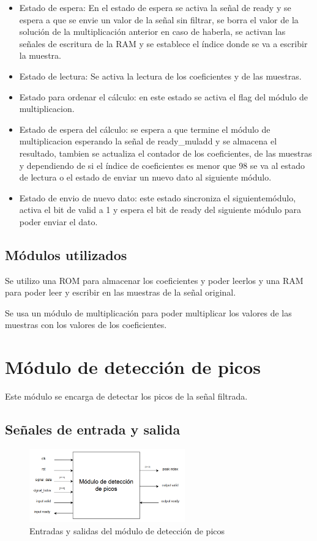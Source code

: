 \begin{itemize}
    \item Estado de espera: En el estado de espera se activa la señal de ready y se espera a que se envie un valor de la
    señal sin filtrar, se borra el valor de la solución de la multiplicación anterior en caso de haberla, se activan las
    señales de escritura de la RAM y se establece el índice donde se va a escribir la muestra.
    \item Estado de lectura: Se activa la lectura de los coeficientes y de las muestras.
    \item Estado para ordenar el cálculo: en este estado se activa el flag del módulo de multiplicacion.
    \item Estado de espera del cálculo: se espera a que termine el módulo de multiplicacion esperando la señal de ready\_muladd
    y se almacena el resultado, tambien se actualiza el contador de los coeficientes, de las muestras y dependiendo de si el 
    índice de coeficientes es menor que 98 se va al estado de lectura o el estado de enviar un nuevo dato al siguiente módulo.
    \item Estado de envio de nuevo dato: este estado sincroniza el siguientemódulo, activa el bit de valid a 1 y espera el bit
    de ready del siguiente módulo para poder enviar el dato.
\end{itemize}

\subsection{Módulos utilizados}
Se utilizo una ROM para almacenar los coeficientes y poder leerlos y una RAM 
para poder leer y escribir en las muestras de la señal original.

Se usa un módulo de multiplicación para poder multiplicar los valores de las muestras con los valores de los coeficientes.

\section{Módulo de detección de picos}

Este módulo se encarga de detectar los picos de la señal filtrada. 
\subsection{Señales de entrada y salida}

    \begin{figure}[h!]
        \centering
        \includegraphics[width=0.6\textwidth]{./Images/img_implementacion_hw/diagramamodulodeteccionpicos.png}
        \caption{Entradas y salidas del módulo de detección de picos}
        \label{fig:moddeteccionpicos}
    \end{figure} 
    
